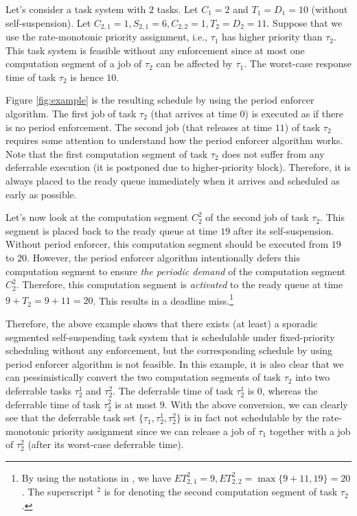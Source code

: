 Let's consider a task system with $2$ tasks. Let $C_1 = 2$ and $T_1=D_1=10$ (without self-suspension). Let $C_{2,1} = 1, S_{2,1} = 6, C_{2,2}=1, T_2=D_2=11$. Suppose that we use the rate-monotonic priority assignment, i.e., $\tau_1$ has higher priority than $\tau_2$. This task system is feasible without any enforcement since at most one computation segment of a job of $\tau_2$ can be affected by $\tau_1$. The worst-case response time of task $\tau_2$ is hence $10$. 

Figure \ref{fig:example} is the resulting schedule by using the period enforcer algorithm. The first job of task $\tau_2$ (that arrives at time $0$) is executed as if there is no period enforcement. The second job (that releases at time $11$) of task $\tau_2$ requires some attention to understand how the period enforcer algorithm works. Note that the first computation segment of task $\tau_2$ does not suffer from any deferrable execution (it is postponed due to higher-priority block). Therefore, it is always placed to the ready queue immediately when it arrives and scheduled as early as possible.

Let's now look at the computation segment $C_2^2$ of the second job of task $\tau_2$. This segment is placed back to the ready queue at time $19$ after its self-suspension. Without period enforcer, this computation segment should be executed from $19$ to $20$. However, the period enforcer algorithm intentionally defers this computation segment to ensure \emph{the periodic demand} of the computation segment $C_2^2$. Therefore, this computation segment is \emph{activated} to the ready queue at time $9+T_2=9+11=20$. This results in a deadline miss.\footnote{By using the notations in \cite{Raj:suspension1991}, we have $ET_{2,1}^2=9, ET_{2,2}^2 = \max\{9+11, 19\}=20$. The superscript $^2$ is for denoting the second computation segment of task $\tau_2$.}

Therefore, the above example shows that there exists (at least) a sporadic segmented self-suspending task system that is schedulable under fixed-priority scheduling without any enforcement, but the corresponding schedule by using period enforcer algorithm is not feasible. In this example, it is also clear that we can pessimistically convert the two computation segments of task $\tau_2$ into two deferrable tasks $\tau_2^1$ and $\tau_2^2$. The deferrable time of task $\tau_2^1$ is $0$, whereas the deferrable time of task $\tau_2^2$ is at most \emph{$9$}. With the above conversion, we can clearly see that the deferrable task set $\{\tau_1, \tau_2^1, \tau_2^2\}$ is in fact not schedulable by the rate-monotonic priority assignment since we can release a job of $\tau_1$ together with a job of $\tau_2^2$ (after its worst-case deferrable time).

